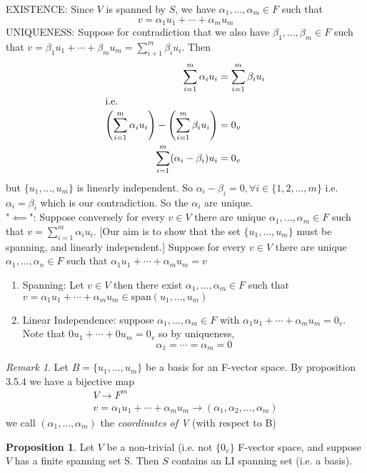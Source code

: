 \documentclass{report}
\theoremstyle{remark}
\newtheorem{remark}[theorem]{Remark}
\theoremstyle{definition}
\theoremstyle{definition}
\theoremstyle{theorem}
\newtheorem{proposition}[theorem]{Proposition}
\begin{document}
EXISTENCE: Since $V$ is spanned by $S$, we have $\alpha_1, ..., \alpha_m \in F$ such that
\[v = \alpha_1u_1 + \cdots + \alpha_mu_m \]
UNIQUENESS: Suppose for contradiction that we also have $\beta_1, ..., \beta_m \in F$ such that $v = \beta_1u_1 + \cdots + \beta_mu_m = \sum^m_{i+1}\beta_iu_i$. Then
\begin{align*}
    \sum^m_{i=1}\alpha_iu_i &= \sum^m_{i=1}\beta_iu_i\\
    \intertext{i.e.}
    \left( \sum^m_{i=1}\alpha_iu_i \right) - \left( \sum^m_{i=1}\beta_iu_i \right) &= 0_v\\
    \sum^m_{i=1}(\alpha_i - \beta_i)u_i &= 0_v
\end{align*}
but $\{ u_1, ..., u_m \}$ is linearly independent. So $\alpha_i - \beta_i = 0, \forall i \in \{1, 2, ..., m\}$ i.e. $\alpha_i = \beta_i$ which is our contradiction. So the $\alpha_i$ are unique. \\
"$\impliedby$": Suppose conversely for every $v \in V$ there are unique $\alpha_1, ..., \alpha_m \in F$ such that $v = \sum^m_{i=1}\alpha_iu_i$. [Our aim is to show that the set $\{u_1, ..., u_m\}$ must be spanning, and linearly independent.] Suppose for every $v \in V$ there are unique $\alpha_1, ..., \alpha_n \in F$ such that $\alpha_1u_1 + \cdots + \alpha_mu_m = v$
\begin{enumerate}
    \item Spanning: Let $v \in V$ then there exist $\alpha_1, ..., \alpha_m \in F$ such that $v = \alpha_1u_1 + \cdots + \alpha_mu_m \in \text{span}(u_1, ..., u_m)$
    \item Linear Independence: suppose $\alpha_1, ..., \alpha_m \in F$ with $\alpha_1u_1 + \cdots + \alpha_mu_m = 0_v$. Note that $0u_1 + \cdots + 0u_m = 0_v$ so by uniqueness, 
    \[\alpha_1 = \cdots = \alpha_m = 0\]
\end{enumerate}
\begin{remark}
Let $B = \{ u_1, ..., u_m\}$ be a basis for an F-vector space. By proposition 3.5.4 we have a bijective map
\begin{gather*}
    V \longrightarrow F^m\\
    v = \alpha_1u_1 + \cdots + \alpha_mu_m \rightarrow (\alpha_1, \alpha_2, ..., \alpha_m)
\end{gather*}
we call $(\alpha_1, ..., \alpha_m)$ the \emph{coordinates of V} (with respect to B)
\end{remark}
\begin{proposition}
Let $V$ be a non-trivial (i.e. not $\{0_v\}$ F-vector space, and suppose $V$ has a finite spanning set S. Then $S$ contains an LI spanning set (i.e. a basis).
\end{proposition}
\end{document}
